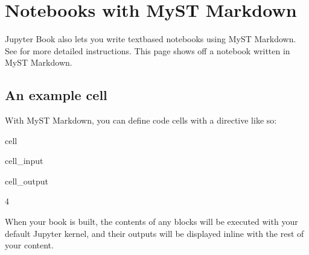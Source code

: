 \documentclass[letterpaper,10pt,english]{jupyterBook}
\begin{document}
\sphinxstepscope


\chapter{Notebooks with MyST Markdown}
\label{\detokenize{markdown-notebooks:notebooks-with-myst-markdown}}\label{\detokenize{markdown-notebooks::doc}}
\sphinxAtStartPar
Jupyter Book also lets you write text\sphinxhyphen{}based notebooks using MyST Markdown.
See  for more detailed instructions.
This page shows off a notebook written in MyST Markdown.


\section{An example cell}
\label{\detokenize{markdown-notebooks:an-example-cell}}
\sphinxAtStartPar
With MyST Markdown, you can define code cells with a directive like so:

\begin{sphinxuseclass}{cell}\begin{sphinxVerbatimInput}

\begin{sphinxuseclass}{cell_input}
\begin{sphinxVerbatim}[commandchars=\\\{\}]
  
\end{sphinxVerbatim}

\end{sphinxuseclass}\end{sphinxVerbatimInput}
\begin{sphinxVerbatimOutput}

\begin{sphinxuseclass}{cell_output}
\begin{sphinxVerbatim}[commandchars=\\\{\}]
4
\end{sphinxVerbatim}

\end{sphinxuseclass}\end{sphinxVerbatimOutput}

\end{sphinxuseclass}
\sphinxAtStartPar
When your book is built, the contents of any  blocks will be
executed with your default Jupyter kernel, and their outputs will be displayed
in\sphinxhyphen{}line with the rest of your content.
\end{document}
